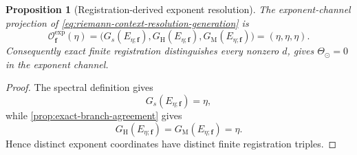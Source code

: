\documentclass[11pt,a4paper]{article}
\newtheorem{proposition}[theorem]{Proposition}
\theoremstyle{definition}
\begin{document}
\begin{proposition}[Registration-derived exponent resolution]
\label{prop:riemann-registration-recovery}
The exponent-channel projection of
\cref{eq:riemann-context-resolution-generation} is
\begin{equation}
\label{eq:registered-exponent-observation}
  \mathcal O_{\mathbf f}^{\mathrm{exp}}(\eta)
  =
  \bigl(
    G_s(E_{\eta;\mathbf f}),
    G_{\mathrm H}(E_{\eta;\mathbf f}),
    G_{\mathrm M}(E_{\eta;\mathbf f})
  \bigr)
  =
  (\eta,\eta,\eta).
\end{equation}
Consequently exact finite registration distinguishes every nonzero $d$, gives
$\Theta_\odot=0$ in the exponent channel.
\end{proposition}

\begin{proof}
The spectral definition gives
\[
  G_s(E_{\eta;\mathbf f})=\eta,
\]
while \cref{prop:exact-branch-agreement} gives
\[
  G_{\mathrm H}(E_{\eta;\mathbf f})
  =G_{\mathrm M}(E_{\eta;\mathbf f})=\eta.
\]
Hence distinct exponent
coordinates have distinct finite registration triples.
\end{proof}
\end{document}
